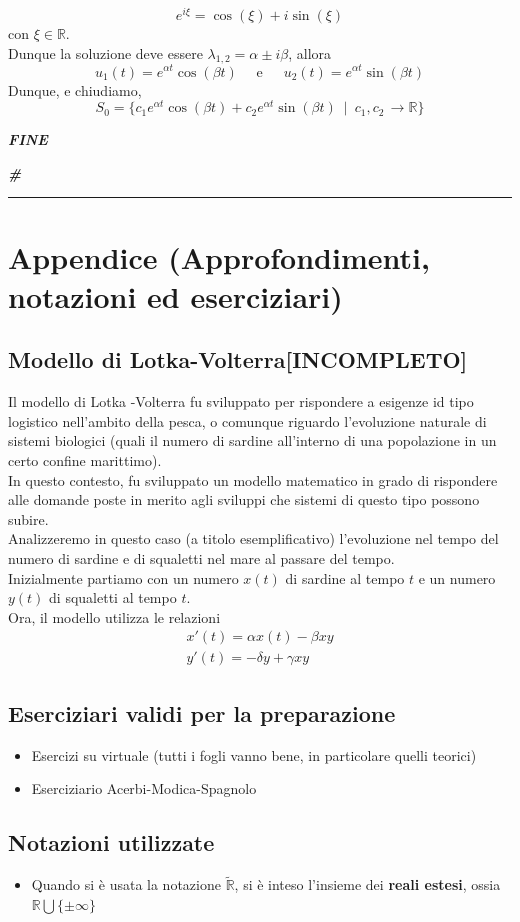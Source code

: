 \documentclass{article}
\theoremstyle{definition}
\newcommand{\linea}{\vspace{15pt}\hrule\vspace{15pt}}
\newcommand{\R}{\mathbb{R}}
\newcommand{\cvd}{\begin{center} \textbf{\textit{\#}} \end{center}}
\begin{document}
\begin{equation}
    e^{i \xi }= \cos (\xi) + i \sin (\xi)
\end{equation}
con $ \xi \in \R$.
\\
Dunque la soluzione deve essere $\lambda_{1,2}=\alpha \pm i \beta$, allora
\begin{equation}
    u_1(t)=e^{\alpha t} \cos (\beta t) \,\,\,\,\,\,\,\, \mbox{e} \,\,\,\,\,\,\,\,\, u_2(t)=e^{\alpha t} \sin (\beta t)
\end{equation}
Dunque, e chiudiamo,
\begin{equation}
    S_0=\{c_1 e^{\alpha t} \cos (\beta t) + c_2 e ^{\alpha t} \sin (\beta t) \,\,\, | \,\,\, c_1,c_2 \, \to \R\}
\end{equation}
\begin{center}
\textbf{\textit{FINE}}
\end{center}
\cvd
\newpage

\linea
\section{Appendice (Approfondimenti, notazioni ed eserciziari)}
\subsection{Modello di Lotka-Volterra[INCOMPLETO]}
Il modello di Lotka -Volterra fu sviluppato per rispondere a esigenze id tipo logistico nell'ambito della pesca, o comunque riguardo l'evoluzione naturale di sistemi biologici (quali il numero di sardine all'interno di una popolazione in un certo confine marittimo).
\\
In questo contesto, fu sviluppato un modello matematico in grado di rispondere alle domande poste in merito agli sviluppi che sistemi di questo tipo possono subire.
\\
Analizzeremo in questo caso (a titolo esemplificativo) l'evoluzione nel tempo del numero di sardine e di squaletti nel mare al passare del tempo.
\\
Inizialmente partiamo con un numero $x(t)$ di sardine al tempo $t$ e un numero $y(t)$ di squaletti al tempo $t$.
\\
Ora, il modello utilizza le relazioni
\begin{align*}
    x'(t)=\alpha x(t) - \beta xy \\
    y'(t) =-\delta y + \gamma xy
\end{align*}
\subsection{Eserciziari validi per la preparazione}
\begin{itemize}
    \item Esercizi su virtuale (tutti i fogli vanno bene, in particolare quelli teorici)
    \item Eserciziario Acerbi-Modica-Spagnolo
\end{itemize}
\subsection{Notazioni utilizzate}
\begin{itemize}
    \item Quando si è usata la notazione $\tilde{\R}$, si è inteso l'insieme dei \textbf{reali estesi}, ossia $\R \bigcup \{\pm \infty\}$
\end{itemize}
\end{document}
